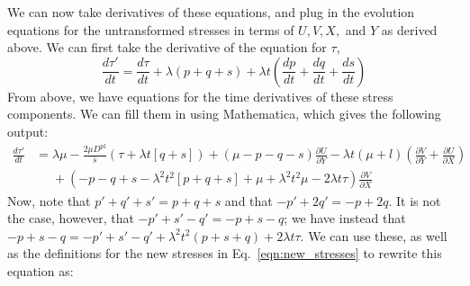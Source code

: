 \documentclass[11pt]{article}
\newcommand{\p}{\partial}
\newcommand{\Dpl}{D^\text{pl}}
\begin{document}
We can now take derivatives of these equations, and plug in the evolution equations for the untransformed stresses in terms of $U, V, X,$ and $Y$ as derived above. We can first take the derivative of the equation for $\tau$,
\begin{equation*}
    \frac{d\tau'}{dt} = \frac{d\tau}{dt} + \lambda(p + q + s) + \lambda t\left(\frac{dp}{dt} + \frac{dq}{dt} + \frac{ds}{dt}\right)
\end{equation*}
From above, we have equations for the time derivatives of these stress components. We can fill them in using Mathematica, which gives the following output:
\begin{align*}
    \frac{d\tau'}{dt} &= \lambda\mu - \frac{2\mu\Dpl}{\bar{s}}(\tau + \lambda t[q + s]) + (\mu - p - q - s)\frac{\p U}{\p Y} - \lambda t (\mu + l)\left( \frac{\p V}{\p Y} + \frac{\p U}{\p X} \right)\\
    &\phantom{=} + (-p  - q + s - \lambda^2 t ^2 [p + q + s] + \mu + \lambda^2 t^2 \mu - 2\lambda t \tau)\frac{\p V}{\p X}
\end{align*}
Now, note that $p' + q' + s' = p + q + s$ and that $-p' + 2q' = -p + 2q$. It is not the case, however, that $-p' + s' - q' = -p + s -q$; we have instead that $-p + s -q = -p' + s' -q' + \lambda^2t^2(p + s + q) + 2\lambda t \tau$. We can use these, as well as the definitions for the new stresses in Eq.~\ref{eqn:new_stresses} to rewrite this equation as:
\end{document}
